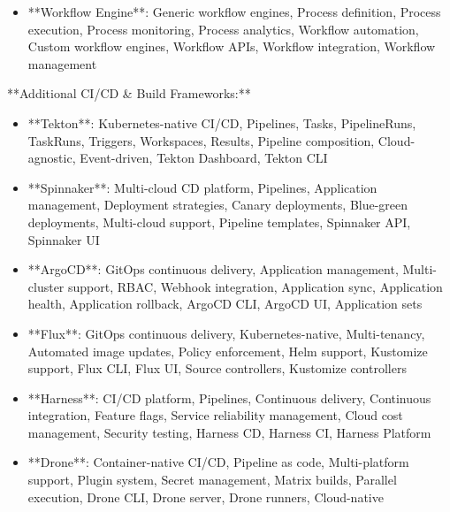 \documentclass[11pt,a4paper]{article}
\begin{document}
\begin{itemize}
\item **Workflow Engine**: Generic workflow engines, Process definition, Process execution, Process monitoring, Process analytics, Workflow automation, Custom workflow engines, Workflow APIs, Workflow integration, Workflow management
\end{itemize}

**Additional CI/CD \& Build Frameworks:**

\begin{itemize}
\item **Tekton**: Kubernetes-native CI/CD, Pipelines, Tasks, PipelineRuns, TaskRuns, Triggers, Workspaces, Results, Pipeline composition, Cloud-agnostic, Event-driven, Tekton Dashboard, Tekton CLI
\end{itemize}

\begin{itemize}
\item **Spinnaker**: Multi-cloud CD platform, Pipelines, Application management, Deployment strategies, Canary deployments, Blue-green deployments, Multi-cloud support, Pipeline templates, Spinnaker API, Spinnaker UI
\end{itemize}

\begin{itemize}
\item **ArgoCD**: GitOps continuous delivery, Application management, Multi-cluster support, RBAC, Webhook integration, Application sync, Application health, Application rollback, ArgoCD CLI, ArgoCD UI, Application sets
\end{itemize}

\begin{itemize}
\item **Flux**: GitOps continuous delivery, Kubernetes-native, Multi-tenancy, Automated image updates, Policy enforcement, Helm support, Kustomize support, Flux CLI, Flux UI, Source controllers, Kustomize controllers
\end{itemize}

\begin{itemize}
\item **Harness**: CI/CD platform, Pipelines, Continuous delivery, Continuous integration, Feature flags, Service reliability management, Cloud cost management, Security testing, Harness CD, Harness CI, Harness Platform
\end{itemize}

\begin{itemize}
\item **Drone**: Container-native CI/CD, Pipeline as code, Multi-platform support, Plugin system, Secret management, Matrix builds, Parallel execution, Drone CLI, Drone server, Drone runners, Cloud-native
\end{itemize}
\end{document}
